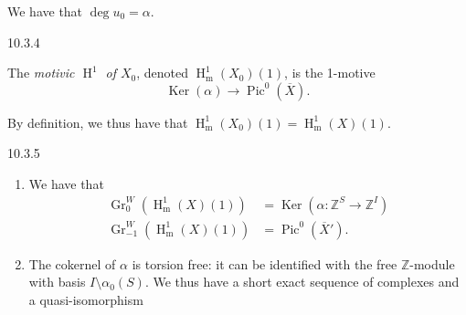     We have that \(\operatorname {deg} u_0=\alpha \).\begin{definition}{10.3.4}\label{hodge-theory-iii-10.3.4}\skipsinglepar\par{}The \emph{motivic \(\operatorname {H}^1\) of \(X_0\)}, denoted \(\operatorname {H}_\mathrm {m}^1(X_0)(1)\), is the 1-motive
    \[       \operatorname {Ker}(\alpha )       \to  \operatorname {Pic}^0(\overline {X}).     \]\par{}By definition, we thus have that \(\operatorname {H}_\mathrm {m}^1(X_0)(1)=\operatorname {H}_\mathrm {m}^1(X)(1)\).\end{definition}\begin{remarks}{10.3.5}\label{hodge-theory-iii-10.3.5}\skipsinglepar\begin{enumerate}
    
 \item[(i)]
      We have that
      \[         \begin {aligned}           \operatorname {Gr}_0^W(\operatorname {H}_\mathrm {m}^1(X)(1))           &= \operatorname {Ker}(\alpha \colon \mathbb {Z}^S\to \mathbb {Z}^I)         \\\operatorname {Gr}_{-1}^W(\operatorname {H}_\mathrm {m}^1(X)(1))           &= \operatorname {Pic}^0(\overline {X}').         \end {aligned}       \]
    


    
 \item[(ii)]
      The cokernel of \(\alpha \) is torsion free: it can be identified with the free \(\mathbb {Z}\)-module with basis \(I\setminus \alpha _0(S)\).
      We thus have a short exact sequence of complexes and a quasi-isomorphism
      

    


\end{enumerate}
\end{remarks}
